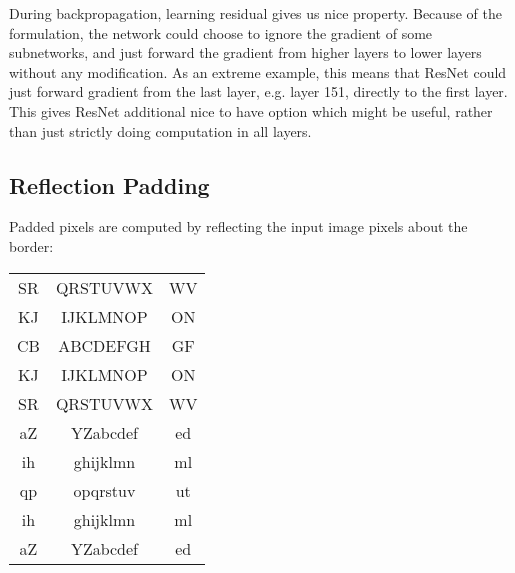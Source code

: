 During backpropagation, learning residual gives us nice property. Because of the formulation, the network could choose to ignore the gradient of some subnetworks, and just forward the gradient from higher layers to lower layers without any modification. As an extreme example, this means that ResNet could just forward gradient from the last layer, e.g. layer 151, directly to the first layer. This gives ResNet additional nice to have option which might be useful, rather than just strictly doing computation in all layers.

\subsection*{Reflection Padding \cite{padding}}
Padded pixels are computed by reflecting the input image
pixels about the border:

\begin{tabular}{c|c|c}
SR & QRSTUVWX & WV\\
KJ & IJKLMNOP & ON\\
\hline
CB&ABCDEFGH&GF\\
KJ&IJKLMNOP&ON\\
SR&QRSTUVWX&WV\\
aZ&YZabcdef&ed\\
ih&ghijklmn&ml\\
qp&opqrstuv&ut\\
\hline
ih&ghijklmn&ml\\
aZ&YZabcdef&ed
\end{tabular}
